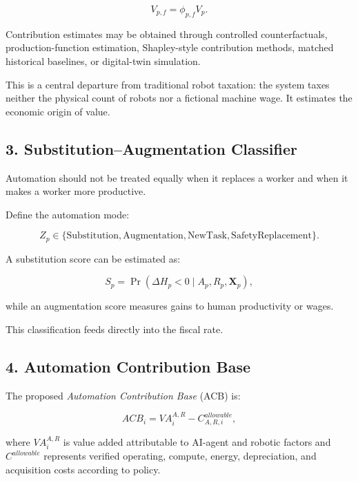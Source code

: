 \documentclass[conference]{IEEEtran}
\begin{document}
\begin{equation}
V_{p,f}=\phi_{p,f} V_p.
\end{equation}

Contribution estimates may be obtained through controlled counterfactuals,
production-function estimation, Shapley-style contribution methods, matched
historical baselines, or digital-twin simulation.

This is a central departure from traditional robot taxation: the system taxes
neither the physical count of robots nor a fictional machine wage. It estimates
the economic origin of value.

\subsection{3. Substitution--Augmentation Classifier}

Automation should not be treated equally when it replaces a worker and when it
makes a worker more productive.

Define the automation mode:

\begin{equation}
Z_p \in
\{\text{Substitution},\text{Augmentation},
\text{NewTask},\text{SafetyReplacement}\}.
\end{equation}

A substitution score can be estimated as:

\begin{equation}
S_p =
\Pr(\Delta H_p < 0 \mid A_p,R_p,\mathbf{X}_p),
\end{equation}

while an augmentation score measures gains to human productivity or wages.

This classification feeds directly into the fiscal rate.

\subsection{4. Automation Contribution Base}

The proposed \textit{Automation Contribution Base} (ACB) is:

\begin{equation}
ACB_i =
VA^{A,R}_i - C^{allowable}_{A,R,i},
\end{equation}

where $VA^{A,R}_i$ is value added attributable to AI-agent and robotic factors
and $C^{allowable}$ represents verified operating, compute, energy,
depreciation, and acquisition costs according to policy.
\end{document}
